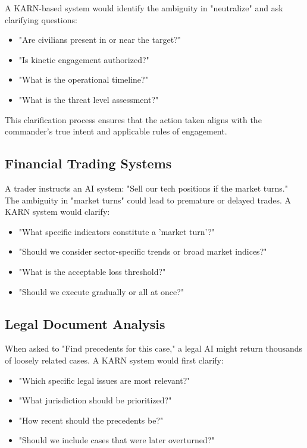 \documentclass[12pt]{article}
\begin{document}
A KARN-based system would identify the ambiguity in "neutralize" and ask clarifying questions:
\begin{itemize}
\item "Are civilians present in or near the target?"
\item "Is kinetic engagement authorized?"
\item "What is the operational timeline?"
\item "What is the threat level assessment?"
\end{itemize}

This clarification process ensures that the action taken aligns with the commander's true intent and applicable rules of engagement.

\subsection{Financial Trading Systems}

A trader instructs an AI system: "Sell our tech positions if the market turns." The ambiguity in "market turns" could lead to premature or delayed trades. A KARN system would clarify:
\begin{itemize}
\item "What specific indicators constitute a 'market turn'?"
\item "Should we consider sector-specific trends or broad market indices?"
\item "What is the acceptable loss threshold?"
\item "Should we execute gradually or all at once?"
\end{itemize}

\subsection{Legal Document Analysis}

When asked to "Find precedents for this case," a legal AI might return thousands of loosely related cases. A KARN system would first clarify:
\begin{itemize}
\item "Which specific legal issues are most relevant?"
\item "What jurisdiction should be prioritized?"
\item "How recent should the precedents be?"
\item "Should we include cases that were later overturned?"
\end{itemize}
\end{document}
